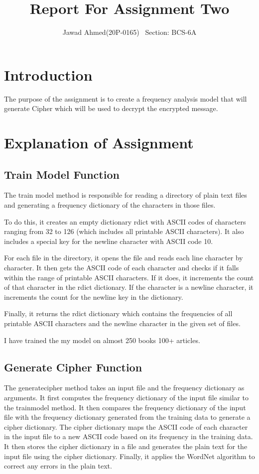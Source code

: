 \documentclass{article}
\title{Report For Assignment Two}
\author{Jawad Ahmed(20P-0165) \ Section: BCS-6A}
\begin{document}
\maketitle

\section{Introduction}

The purpose of the assignment is to create a frequency analysis model that will generate Cipher which will be used to decrypt the encrypted message.

\section{Explanation of Assignment}

\subsection{Train Model Function}

The train model method is responsible for reading a directory of plain text files and generating a frequency dictionary of the characters in those files.

To do this, it creates an empty dictionary rdict with ASCII codes of characters ranging from 32 to 126 (which includes all printable ASCII characters). It also includes a special key for the newline character with ASCII code 10.

For each file in the directory, it opens the file and reads each line character by character. It then gets the ASCII code of each character and checks if it falls within the range of printable ASCII characters. If it does, it increments the count of that character in the rdict dictionary. If the character is a newline character, it increments the count for the newline key in the dictionary.

Finally, it returns the rdict dictionary which contains the frequencies of all printable ASCII characters and the newline character in the given set of files.

I have trained the my model on almost 250 books 100+ articles. 

\subsection{Generate Cipher Function}
The generatecipher method takes an input file and the frequency dictionary as arguments. It first computes the frequency dictionary of the input file similar to the trainmodel method. It then compares the frequency dictionary of the input file with the frequency dictionary generated from the training data to generate a cipher dictionary. The cipher dictionary maps the ASCII code of each character in the input file to a new ASCII code based on its frequency in the training data. It then stores the cipher dictionary in a file and generates the plain text for the input file using the cipher dictionary. Finally, it applies the WordNet algorithm to correct any errors in the plain text.
\end{document}
